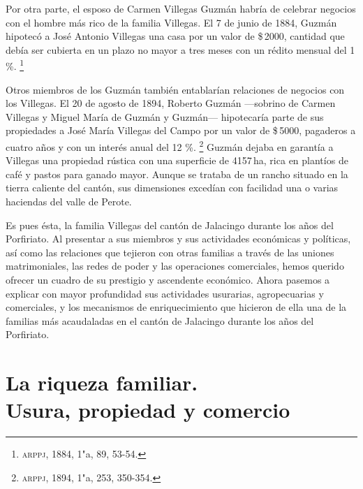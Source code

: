 \documentclass[14pt,twoside,final]{extbook} %
\let\oldfootnote\footnote
\renewcommand\footnote[1]{%
\oldfootnote{\hspace{1mm}#1}}
\begin{document}
Por otra parte, el esposo de Carmen Villegas Guzmán habría de celebrar negocios con el hombre más rico de la familia Villegas. El 7 de junio de 1884, Guzmán hipotecó a José Antonio Villegas una casa por un valor de \$\,2000, cantidad que debía ser cubierta en un plazo no mayor a tres meses con un rédito mensual del 1 \%.\footnote{\textsc{arppj}, 1884, 1"a, 89, 53-54.}

Otros miembros de los Guzmán también entablarían relaciones de negocios con los Villegas. El 20 de agosto de 1894, Roberto Guzmán ---sobrino de Carmen Villegas y Miguel María de Guzmán y Guzmán--- hipotecaría parte de sus propiedades a José María Villegas del Campo por un valor de \$\,5000, pagaderos a cuatro años y con un interés anual del 12 \%.\footnote{\textsc{arppj}, 1894, 1"a, 253, 350-354.} Guzmán dejaba en garantía a Villegas una propiedad rústica con una superficie de 4157\,ha, rica en plantíos de café y pastos para ganado mayor. Aunque se trataba de un rancho situado en la tierra caliente del cantón, sus dimensiones excedían con facilidad una o varias haciendas del valle de Perote.

Es pues ésta, la familia Villegas del cantón de Jalacingo durante los años del Porfiriato. Al presentar a sus miembros y sus actividades económicas y políticas, así como las relaciones que tejieron con otras familias a través de las uniones matrimoniales, las redes de poder y las operaciones comerciales, hemos querido ofrecer un cuadro de su prestigio y ascendente económico. Ahora pasemos a explicar con mayor profundidad sus actividades usurarias, agropecuarias y comerciales, y los mecanismos de enriquecimiento que hicieron de ella una de la familias más acaudaladas en el cantón de Jalacingo durante los años del Porfiriato.
\chapter[La riqueza familiar. Usura, propiedad y comercio]{La riqueza familiar. \\ Usura, propiedad y comercio}\label{ch:capitulo-tres}
\BgThispage
\thispagestyle{empty}
\pagestyle{fancy}
\fancyhf{} %
\fancyhead[RO,LE]{\iffloatpage{}{\thepage}}
\renewcommand\headrulewidth{\iffloatpage{0pt}{0pt}}
\setcounter{page}{89}
\end{document}
